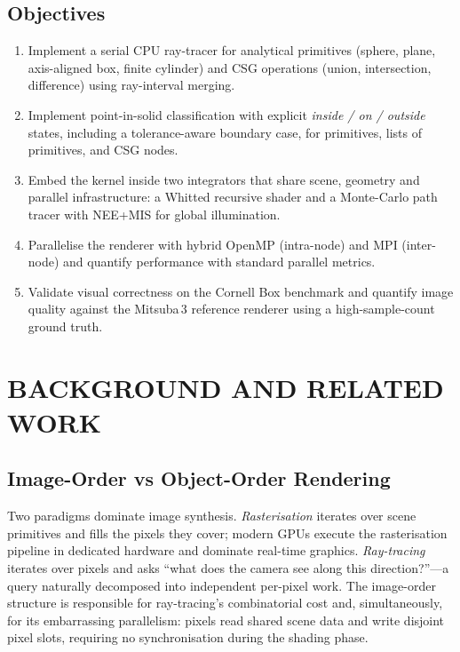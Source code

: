 \documentclass[twocolumn,10pt,cleanhead,cleanfoot]{asme2e}
\begin{document}
\subsection*{Objectives}
\begin{enumerate}
\item Implement a serial CPU ray-tracer for analytical primitives (sphere, plane, axis-aligned box, finite cylinder) and CSG operations (union, intersection, difference) using ray-interval merging.
\item Implement point-in-solid classification with explicit \emph{inside / on / outside} states, including a tolerance-aware boundary case, for primitives, lists of primitives, and CSG nodes.
\item Embed the kernel inside two integrators that share scene, geometry and parallel infrastructure: a Whitted recursive shader and a Monte-Carlo path tracer with NEE+MIS for global illumination.
\item Parallelise the renderer with hybrid OpenMP (intra-node) and MPI (inter-node) and quantify performance with standard parallel metrics.
\item Validate visual correctness on the Cornell Box benchmark and quantify image quality against the Mitsuba\,3 reference renderer using a high-sample-count ground truth.
\end{enumerate}

\section*{BACKGROUND AND RELATED WORK}

\subsection*{Image-Order vs Object-Order Rendering}
Two paradigms dominate image synthesis. \emph{Rasterisation} iterates over scene primitives and fills the pixels they cover; modern GPUs execute the rasterisation pipeline in dedicated hardware and dominate real-time graphics. \emph{Ray-tracing} iterates over pixels and asks ``what does the camera see along this direction?''---a query naturally decomposed into independent per-pixel work. The image-order structure is responsible for ray-tracing's combinatorial cost and, simultaneously, for its embarrassing parallelism: pixels read shared scene data and write disjoint pixel slots, requiring no synchronisation during the shading phase.
\end{document}
